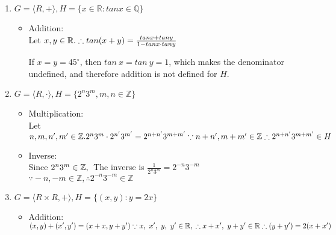 \documentclass[12pt]{article}
\begin{document}
\begin{enumerate}
\item $G = \langle R, + \rangle, H = \{x \in \mathbb{R}: tan x \in \mathbb{Q} \}$

  \begin{itemize}
    \item 
      Addition: \\
      Let $x, y \in \mathbb{R}. \\
      \therefore tan(x+y) = \frac{tanx + tany}{1 - tanx \cdot tany}$

      If $x = y = 45^{\circ}$, then $tan\ x = tan\ y = 1$, which makes the denominator
      undefined, and therefore addition is not defined for $H$.

  \end{itemize}


\item $G = \langle R, \cdot \rangle, H = \{2^{n}3^{m}, m, n \in \mathbb{Z}\}$

  \begin{itemize}
    \item 
      Multiplication: \\
      Let $n, m, n', m' \in \mathbb{Z}. \\
      2^{n}3^{m} \cdot 2^{n'}3^{m'} = 2^{n+n'}3^{m+m'} \\
      \because n + n', m + m' \in \mathbb{Z} \\
      \therefore 2^{n+n'}3^{m+m'} \in H $

    \item 
      Inverse: \\
      Since $2^{n}3^{m} \in \mathbb{Z}, \\ $
      The inverse is $\frac{1}{2^{n}3^{m}} = 2^{-n}3^{-m}$
      $\because -n, -m \in \mathbb{Z}, \therefore  2^{-n}3^{-m} \in \mathbb{Z}$  

  \end{itemize}

\item $G = \langle R \times R, + \rangle, H = \{(x,y) : y = 2x \}$

  \begin{itemize}
    \item
      Addition: \\
      $(x,y) + (x',y') = (x+x, y+y') \\
      \because x,\ x',\ y,\ y' \in \mathbb{R}, \\
      \therefore x+x',\ y+y' \in \mathbb{R} \\
      \therefore (y+y') = 2(x+x')$


\end{itemize}
\end{enumerate}
\end{document}
